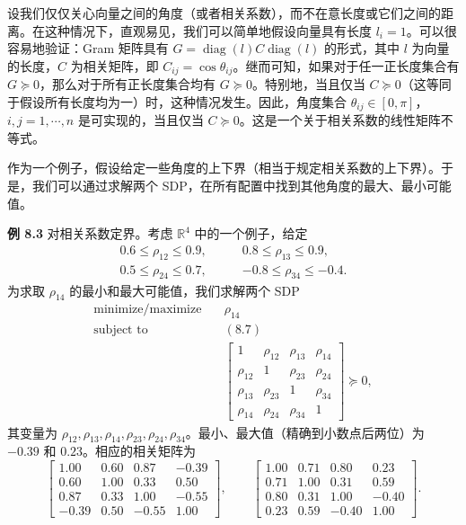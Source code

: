 \documentclass[UTF8,12pt,a4paper,fontset=fandol]{ctexart}
\begin{document}
设我们仅仅关心向量之间的角度（或者相关系数），而不在意长度或它们之间的距离。在这种情况下，直观易见，我们可以简单地假设向量具有长度 $l_i=1$。可以很容易地验证：Gram 矩阵具有 $G=\operatorname{diag}(l)C\operatorname{diag}(l)$ 的形式，其中 $l$ 为向量的长度，$C$ 为相关矩阵，即 $C_{ij}=\cos\theta_{ij}$。继而可知，如果对于任一正长度集合有 $G\succeq 0$，那么对于所有正长度集合均有 $G\succeq 0$。特别地，当且仅当 $C\succeq 0$（这等同于假设所有长度均为一）时，这种情况发生。因此，角度集合 $\theta_{ij}\in[0,\pi]$，$i,j=1,\cdots,n$ 是可实现的，当且仅当 $C\succeq 0$。这是一个关于相关系数的线性矩阵不等式。

作为一个例子，假设给定一些角度的上下界（相当于规定相关系数的上下界）。于是，我们可以通过求解两个 SDP，在所有配置中找到其他角度的最大、最小可能值。

\noindent\textbf{例 8.3}\quad
对相关系数定界。考虑 $\mathbb{R}^4$ 中的一个例子，给定
\begin{equation}
\begin{aligned}
0.6\leq \rho_{12}\leq 0.9,\qquad &0.8\leq \rho_{13}\leq 0.9,\\
0.5\leq \rho_{24}\leq 0.7,\qquad &-0.8\leq \rho_{34}\leq -0.4.
\end{aligned}
\tag{8.7}
\end{equation}
为求取 $\rho_{14}$ 的最小和最大可能值，我们求解两个 SDP
\[
\begin{aligned}
\text{minimize/maximize}\quad & \rho_{14}\\
\text{subject to}\quad & (8.7)\\
& \begin{bmatrix}
1 & \rho_{12} & \rho_{13} & \rho_{14}\\
\rho_{12} & 1 & \rho_{23} & \rho_{24}\\
\rho_{13} & \rho_{23} & 1 & \rho_{34}\\
\rho_{14} & \rho_{24} & \rho_{34} & 1
\end{bmatrix}\succeq 0,
\end{aligned}
\]
其变量为 $\rho_{12},\rho_{13},\rho_{14},\rho_{23},\rho_{24},\rho_{34}$。最小、最大值（精确到小数点后两位）为 $-0.39$ 和 $0.23$。相应的相关矩阵为
\[
\begin{bmatrix}
1.00 & 0.60 & 0.87 & -0.39\\
0.60 & 1.00 & 0.33 & 0.50\\
0.87 & 0.33 & 1.00 & -0.55\\
-0.39 & 0.50 & -0.55 & 1.00
\end{bmatrix},
\qquad
\begin{bmatrix}
1.00 & 0.71 & 0.80 & 0.23\\
0.71 & 1.00 & 0.31 & 0.59\\
0.80 & 0.31 & 1.00 & -0.40\\
0.23 & 0.59 & -0.40 & 1.00
\end{bmatrix}.
\]
\end{document}
